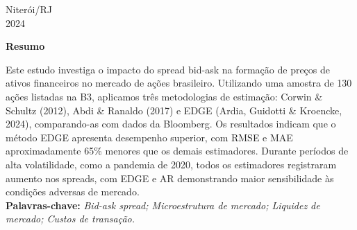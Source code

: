     \begin{center}
        Niterói/RJ\\[0.2cm]
        2024 
    \end{center}
    
    \newpage
    
    \begin{center}
        \textbf{\Large Resumo}\\[0.2cm]
    \end{center}
    
    
    
    \begin{flushleft}
        \setlength{\parskip}{1cm} %
        \linespread{1.5}\selectfont %
        \hspace*{0cm}\parbox{16.5cm}{
            Este estudo investiga o impacto do spread bid-ask na formação de preços de ativos financeiros no mercado de ações brasileiro. Utilizando uma amostra de 130 ações listadas na B3, aplicamos três metodologias de estimação: Corwin \& Schultz (2012), Abdi \& Ranaldo (2017) e EDGE (Ardia, Guidotti \& Kroencke, 2024), comparando-as com dados da Bloomberg. Os resultados indicam que o método EDGE apresenta desempenho superior, com RMSE e MAE aproximadamente 65\% menores que os demais estimadores. Durante períodos de alta volatilidade, como a pandemia de 2020, todos os estimadores registraram aumento nos spreads, com EDGE e AR demonstrando maior sensibilidade às condições adversas de mercado.
            \\
            \linespread{1.5}\selectfont
            \textbf{Palavras-chave:} \textit{Bid-ask spread; Microestrutura de mercado; Liquidez de mercado; Custos de transação.}
        }
    \end{flushleft}
    \newpage
    
    
    
